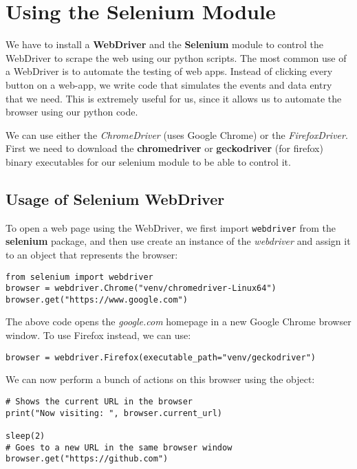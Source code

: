 \chapter{Using the Selenium Module}
We have to install a \textbf{WebDriver} and the \textbf{Selenium} module to control the WebDriver to scrape the web using our python scripts. The most common use of a WebDriver is to automate the testing of web apps. Instead of clicking every button on a web-app, we write code that simulates the events and data entry that we need. This is extremely useful for us, since it allows us to automate the browser using our python code.

We can use either the \textit{ChromeDriver} (uses Google Chrome) or the \textit{FirefoxDriver}. First we need to download the \textbf{chromedriver} or \textbf{geckodriver} (for firefox) binary executables for our selenium module to be able to control it. 

\section{Usage of Selenium WebDriver}
To open a web page using the WebDriver, we first import \verb|webdriver| from the \textbf{selenium} package, and then use create an instance of the \textit{webdriver} and assign it to an object that represents the browser:

\vspace{-15pt}
\begin{verbatim}
from selenium import webdriver
browser = webdriver.Chrome("venv/chromedriver-Linux64")
browser.get("https://www.google.com")
\end{verbatim}
\vspace{-10pt}	

\noindent
The above code opens the \textit{google.com} homepage in a new Google Chrome browser window. To use Firefox instead, we can use:

\vspace{-15pt}
\begin{verbatim}
browser = webdriver.Firefox(executable_path="venv/geckodriver")
\end{verbatim}
\vspace{-10pt}	

\noindent
We can now perform a bunch of actions on this browser using the object:

\vspace{-15pt}
\begin{verbatim}
# Shows the current URL in the browser
print("Now visiting: ", browser.current_url)

sleep(2)
# Goes to a new URL in the same browser window
browser.get("https://github.com")
\end{verbatim}
\vspace{-10pt}	

